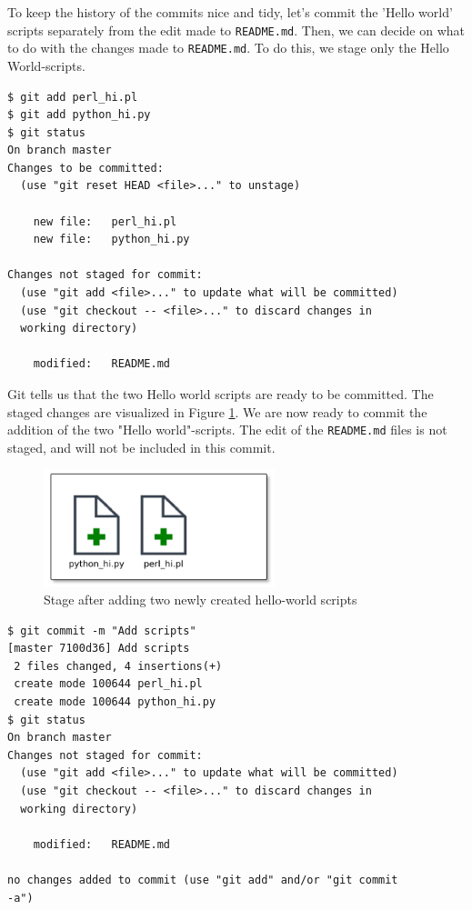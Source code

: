 \documentclass[../main/git_course_main.tex]{subfiles}
\begin{document}
To keep the history of the commits nice and tidy, let's commit the 'Hello world' scripts separately from the edit made to \verb$README.md$. Then, we can decide on what to do with the changes made to \verb$README.md$. To do this, we stage only the Hello World-scripts.

\begin{codebox}
\begin{lstlisting}
$ git add perl_hi.pl
$ git add python_hi.py
$ git status
On branch master
Changes to be committed:
  (use "git reset HEAD <file>..." to unstage)

	new file:   perl_hi.pl
	new file:   python_hi.py

Changes not staged for commit:
  (use "git add <file>..." to update what will be committed)
  (use "git checkout -- <file>..." to discard changes in 
  working directory)

	modified:   README.md
\end{lstlisting}
\end{codebox}

Git tells us that the two Hello world scripts are ready to be committed. The staged changes are visualized in Figure \ref{fig:second_stage}. We are now ready to commit
the addition of the two "Hello world"-scripts. The edit of the \verb$README.md$
files is not staged, and will not be included in this commit.

\begin{figure}[h!]
	\centering
	\includegraphics[width=0.6\textwidth
	]{../visualizations/chapter2/251_stage_created_scripts.pdf}
	\caption{Stage after adding two newly created hello-world scripts}
	\label{fig:second_stage}
\end{figure}

\begin{codebox}
\begin{lstlisting}
$ git commit -m "Add scripts"
[master 7100d36] Add scripts
 2 files changed, 4 insertions(+)
 create mode 100644 perl_hi.pl
 create mode 100644 python_hi.py
$ git status
On branch master
Changes not staged for commit:
  (use "git add <file>..." to update what will be committed)
  (use "git checkout -- <file>..." to discard changes in 
  working directory)

	modified:   README.md

no changes added to commit (use "git add" and/or "git commit 
-a")
\end{lstlisting}
\end{codebox}
\end{document}
